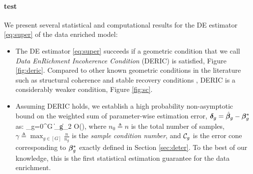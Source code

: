 \paragraph{{test}}
We present several statistical and computational results for the DE estimator \eqref{eq:super} of the data enriched model:
\begin{itemize}[leftmargin = .4cm]
	\item The DE estimator \eqref{eq:super} succeeds if a geometric condition that we call \emph{Data EnRichment Incoherence Condition} (DERIC) is satisfied, Figure \ref{fig:deric}. Compared to other known geometric conditions in the literature such as structural coherence \cite{guba16} and stable recovery conditions \cite{mctr13}, DERIC is a considerably weaker condition, Figure \ref{fig:sc}.
	\item Assuming DERIC holds, we establish a high probability non-asymptotic bound on the weighted sum of parameter-wise estimation error, $\boldsymbol{\delta}_g = \hat{\boldsymbol{\beta}}_g - \boldsymbol{\beta}_g^*$ as:
	\be
	\label{eq:errorsum}
	\sum_{g=0}^{G}   \|\ddelta_g\|_2 \leq  \gamma O\left(\right),
	\ee
	where $n_0 \triangleq n$ is the total number of samples, $\gamma \triangleq \max_{g \in [G] } \frac{n}{n_g}$ is the \emph{sample condition number}, and $\cC_g$ is the error cone corresponding to $\boldsymbol{\beta}_g^*$ exactly defined in Section \ref{sec:deter}.
	To the best of our knowledge, this is the first statistical estimation guarantee for the data enrichment.%
	

\end{itemize}
